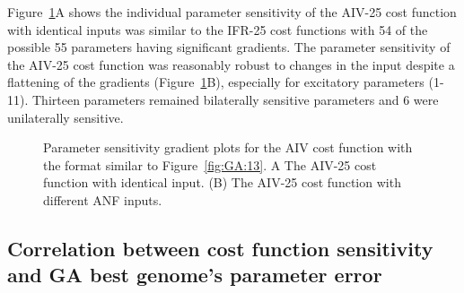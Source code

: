 Figure~\ref{fig:GA:15}A shows the individual parameter sensitivity of the
AIV-25 cost function with identical inputs was similar to the IFR-25 cost
functions with 54 of the possible 55 parameters having significant
gradients.  The parameter sensitivity of the AIV-25 cost function was
reasonably robust to changes in the {\ANF} input despite a flattening of the
gradients (Figure~\ref{fig:GA:15}B), especially for excitatory parameters
(1-11). Thirteen parameters remained bilaterally sensitive parameters and 6
were unilaterally sensitive.  %


\begin{figure}[ht]
  \centering
  \caption{Parameter sensitivity gradient plots for the AIV cost
    function with the format similar to Figure~\ref{fig:GA:13}. A The
    AIV-25 cost function with identical input. (B) The AIV-25 cost
    function with different {ANF} inputs.%
}
  \label{fig:GA:15}
\end{figure}




\subsection[Correlation between sensitivity and best genome error]{Correlation between cost function sensitivity and GA best genome's parameter error}\label{sec:GA:corr-betw-sens}



